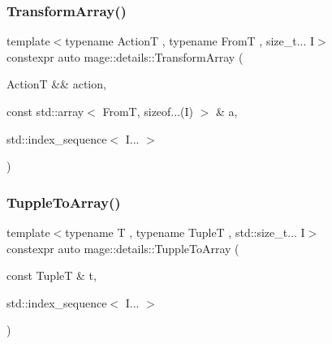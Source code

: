 \mbox{\label{namespacemage_1_1details_aa631b30a1b959924e27691bb8a5abfd9}} 
\subsubsection{\texorpdfstring{Transform\+Array()}{TransformArray()}}
{\footnotesize\ttfamily template$<$typename ActionT , typename FromT , size\+\_\+t... I$>$ \\
constexpr auto mage\+::details\+::\+Transform\+Array (\begin{DoxyParamCaption}\item[{ActionT \&\&}]{action,  }\item[{const std\+::array$<$ FromT, sizeof...(I) $>$ \&}]{a,  }\item[{std\+::index\+\_\+sequence$<$ I... $>$}]{ }\end{DoxyParamCaption})}

\mbox{\label{namespacemage_1_1details_a08e127cc8f86571ccf6633b64be27358}} 
\subsubsection{\texorpdfstring{Tupple\+To\+Array()}{TuppleToArray()}}
{\footnotesize\ttfamily template$<$typename T , typename TupleT , std\+::size\+\_\+t... I$>$ \\
constexpr auto mage\+::details\+::\+Tupple\+To\+Array (\begin{DoxyParamCaption}\item[{const TupleT \&}]{t,  }\item[{std\+::index\+\_\+sequence$<$ I... $>$}]{ }\end{DoxyParamCaption})}

